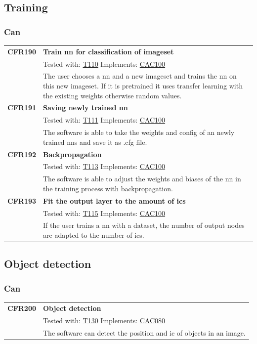 \documentclass[parskip=full]{scrartcl}
\begin{document}
\subsection{Training}
\subsubsection{Can}
\begin{tabular}{p{2cm}p{11.4cm}}
\textbf{CFR190} \hypertarget{CFR110} & \textbf{Train \gls{nn} for classification of imageset}\\
& Tested with: \hyperlink{T110}{T110} Implements: \hyperlink{CAC100}{CAC100} \\
& The user chooses a \gls{nn} and a new imageset and trains the \gls{nn} on this new imageset. If it is pretrained it uses transfer learning with the existing weights otherwise random values.\\
\textbf {CFR191} \hypertarget{CFR111} & \textbf{Saving newly trained \gls{nn}} \\
& Tested with: \hyperlink{T111}{T111} Implements: \hyperlink{CAC100}{CAC100} \\
& The software is able to take the weights and config of an newly trained \glspl{nn} and save it as .cfg file. \\
\textbf {CFR192} \hypertarget{CFR113} & \textbf{Backpropagation} \\
& Tested with: \hyperlink{T113}{T113} Implements: \hyperlink{CAC100}{CAC100} \\
& The software is able to adjust the weights and biases of the \gls{nn} in the training process with backpropagation.\\
\textbf{CFR193} \hypertarget{CFR115} & \textbf{Fit the output layer to the amount of \glspl{ic}}\\
& Tested with: \hyperlink{T115}{T115} Implements: \hyperlink{CAC100}{CAC100} \\
& If the user trains a \gls{nn} with a dataset, the number of output nodes are adapted to the number of \glspl{ic}.\\
\end{tabular}

\subsection{Object detection}
\subsubsection{Can}
\begin{tabular}{p{2cm}p{11.4cm}}
\textbf {CFR200} \hypertarget{CFR130} & \textbf{Object detection} \\
& Tested with: \hyperlink{T130}{T130} Implements: \hyperlink{CAC080}{CAC080} \\
& The software can detect the position and \gls{ic} of objects in an image.\\
\end{tabular}
\end{document}
